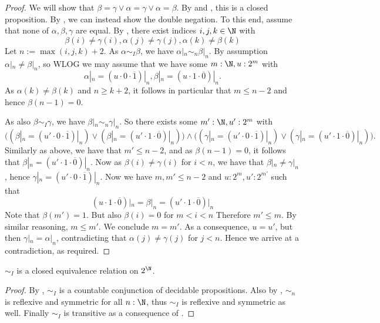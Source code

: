 \begin{proof}
  We will show that $\beta = \gamma \vee \alpha = \gamma \vee \alpha = \beta$. 
  By  and , this is a closed proposition. 
  By , we can instead show the double negation. 
  To this end, assume that none of $\alpha,\beta,\gamma$ are equal. 
  By , there exist indices $i,j,k\in \N$ with 
  \begin{equation}
    \beta(i) \neq \gamma(i), \alpha(j) \neq \gamma(j), \alpha(k) \neq \beta(k)
  \end{equation}
  Let $n:=\max(i,j,k) + 2$. 
  As $\alpha\sim_I \beta$, we have $\alpha|_n\sim_n\beta|_n$. 
  By assumption $\alpha|_n \neq \beta|_n$, so WLOG we may assume that 
  we have some $m: \N, u:2^m$ with 
  \begin{equation}
    \alpha|_n = (u\cdot 0 \cdot \overline 1) |_n , \beta|_n = (u \cdot 1 \cdot \overline 0)|_n.
  \end{equation}
  As $\alpha(k) \neq \beta(k) $ and $n\geq k+2$, 
  it follows in particular that $m\leq n-2$ and hence 
  $\beta(n-1) = 0$.%

  As also $\beta\sim_I \gamma$, we have $\beta|_n \sim_n \gamma|_n$.
  So there exists some $m':\N, u':2^m$ with 
 \begin{equation}\label{EqnNearness}
   \big(
     (\beta|_{n} = (u'\cdot 0\cdot \overline 1)|_n) \vee (\beta|_{n} = (u' \cdot 1 \cdot \overline 0) |_n)
   \big)
    \wedge 
   \big(
     (\gamma|_{n} = (u'\cdot 0\cdot \overline 1)|_n) \vee (\gamma|_{n} = (u' \cdot 1 \cdot \overline 0) |_n)
   \big).
  \end{equation} 
  Similarly as above, we have that $m'\leq n-2$, and as $\beta(n-1) = 0$, it follows that 
  $\beta|_{n} = (u' \cdot 1 \cdot \overline 0) |_n$. 
  Now as $\beta(i)\neq \gamma(i)$ for $i<n$, we have that $\beta|_n \neq \gamma|_n$, hence 
  $\gamma|_{n} = (u'\cdot 0\cdot \overline 1)|_n$. 
  Now we have $m,m'\leq n-2$ and $u:2^m, u':2^{m'}$ such that 
  \begin{equation}
    (u\cdot 1 \cdot \overline 0)|_n = \beta|_n = (u'\cdot 1 \cdot \overline 0)|_n
  \end{equation}
  Note that $\beta(m') = 1$. 
  But also $\beta(i) = 0$ for $m<i<n$
  Therefore $m'\leq m$. 
  By similar reasoning, $m\leq m'$. We conclude $m=m'$. 
  As a consequence, $u = u'$, but then 
  $\gamma|_n = \alpha|_n$, contradicting that $\alpha(j)\neq \gamma(j) $ for $j<n$. 
  Hence we arrive at a contradiction, as required. 
\end{proof}


\begin{corollary}
  $\sim_I$ is a closed equivalence relation on $2^\N$. 
\end{corollary}
\begin{proof}
  By , $\sim_I$ is a countable conjunction of decidable propositions. 
  Also by , $\sim_n$ is reflexive and symmetric for all $n:\N$, thus
  $\sim_I$ is reflexive and symmetric as well. 
  Finally $\sim_I$ is transitive as a consequence of .
\end{proof}
